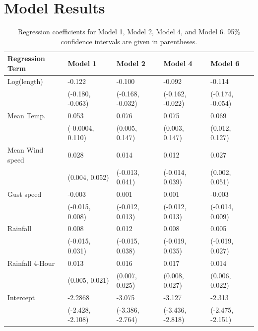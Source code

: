 \documentclass[12pt,twoside]{reedthesis}
\begin{document}
  \section{Model Results}\label{model-results}
  
  \begin{table}[htb]
  \centering
  \def\arraystretch{1.3}
  \caption[Regression coefficients for Models 1, 2, 4, and 6.]{Regression coefficients for Model 1, Model 2, Model 4, and Model 6. 
  95\% confidence intervals are given in parentheses.\label{tab:modelcoef}}
  \begin{tabular}{lllll}
  \toprule
   Regression Term &  Model 1 &  Model 2 &  Model 4 & Model 6\\
  \midrule
  Log(length) & -0.122 & -0.100 & -0.092 & -0.114\\
  & \footnotesize (-0.180, -0.063) & \footnotesize (-0.168, -0.032) & 
  \footnotesize (-0.162, -0.022) & \footnotesize (-0.174, -0.054)\\
  Mean Temp. & 0.053 &  0.076 & 0.075 & 0.069\\
  & \footnotesize (-0.0004, 0.110) & \footnotesize (0.005, 0.147) & 
  \footnotesize (0.003, 0.147)  & \footnotesize (0.012, 0.127)\\
  Mean Wind speed & 0.028 & 0.014 & 0.012 & 0.027\\
  & \footnotesize (0.004, 0.052) & \footnotesize (-0.013, 0.041) & 
  \footnotesize (-0.014, 0.039) & \footnotesize (0.002, 0.051)\\
  Gust speed & -0.003 & 0.001 & 0.001 & -0.003\\
  & \footnotesize (-0.015, 0.008) & \footnotesize (-0.012, 0.013) & 
  \footnotesize (-0.012, 0.013) & \footnotesize (-0.014, 0.009)\\
  Rainfall & 0.008 & 0.012 & 0.008 & 0.005\\
  & \footnotesize (-0.015, 0.031) & \footnotesize (-0.015, 0.038) & 
  \footnotesize (-0.019, 0.035) & \footnotesize (-0.019, 0.027)\\
  Rainfall 4-Hour & 0.013 & 0.016 & 0.017 & 0.014\\
  & \footnotesize (0.005, 0.021) & \footnotesize (0.007, 0.025) &
  \footnotesize (0.008, 0.027) & \footnotesize (0.006, 0.022)\\
  Intercept & -2.2868 & -3.075 & -3.127 & -2.313\\
  & \footnotesize (-2.428, -2.108) & \footnotesize (-3.386, -2.764) &
  \footnotesize (-3.436, -2.818) & \footnotesize (-2.475, -2.151)\\ 
  \bottomrule
  \end{tabular}
  \end{table}
  
\end{document}
